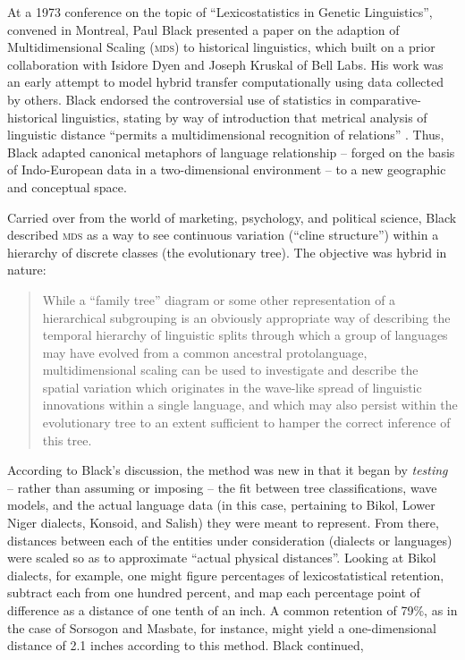 \documentclass[output=paper]{langscibook}
\begin{document}
At a 1973 conference on the topic of ``Lexicostatistics in Genetic Linguistics'', convened in Montreal, Paul Black presented a paper on the adaption of Multidimensional Scaling (\textsc{mds}) to historical linguistics, which built on a prior collaboration with Isidore Dyen and Joseph Kruskal of Bell Labs. His work was an early attempt to model hybrid transfer computationally using data collected by others. Black endorsed the controversial use of statistics in comparative-historical linguistics, stating by way of introduction that metrical analysis of linguistic distance ``permits a multidimensional recognition of relations'' \citep[43--92]{Black1973}. Thus, Black adapted canonical metaphors of language relationship -- forged on the basis of Indo-European data in a two-dimensional environment -- to a new geographic and conceptual space.

Carried over from the world of marketing, psychology, and political science, Black described \textsc{mds} as a way to see continuous variation (``cline structure'') within a hierarchy of discrete classes (the evolutionary tree).  The objective was hybrid in nature:

\begin{quotation}
While a ``family tree'' diagram or some other representation of a hierarchical subgrouping is an obviously appropriate way of describing the temporal hierarchy of linguistic splits through which a group of languages may have evolved from a common ancestral protolanguage, multidimensional scaling can be used to investigate and describe the spatial variation which originates in the wave-like spread of linguistic innovations within a single language, and which may also persist within the evolutionary tree to an extent sufficient to hamper the correct inference of this tree.  \citep[43]{Black1973}
\end{quotation}

According to Black's discussion, the method was new in that it began by \emph{testing} -- rather than assuming or imposing -- the fit between tree classifications, wave models, and the actual language data (in this case, pertaining to Bikol, Lower Niger dialects, Konsoid, and Salish) they were meant to represent. From there, distances between each of the entities under consideration (dialects or languages) were scaled so as to approximate ``actual physical distances''. Looking at Bikol dialects, for example, one might figure percentages of lexicostatistical retention, subtract each from one hundred percent, and map each percentage point of difference as a distance of one tenth of an inch. A common retention of 79\%, as in the case of Sorsogon and Masbate, for instance, might yield a one-dimensional distance of 2.1 inches according to this method. Black continued,
\end{document}
